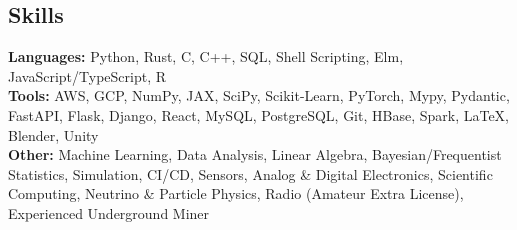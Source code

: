 \documentclass[margin,line]{resume}
\begin{document}
\begin{resume}

    \section{\mysidestyle Skills}\vspace{0mm}%
    \textbf{Languages:} Python, Rust, C, C++, SQL, Shell Scripting, Elm, JavaScript/TypeScript, R
    \vspace{1mm}\\\vspace{0mm}%
    \textbf{Tools:} AWS, GCP, NumPy, JAX, SciPy, Scikit-Learn, PyTorch, Mypy, Pydantic, FastAPI, Flask, Django, React, MySQL, PostgreSQL, Git, HBase, Spark, \LaTeX, Blender, Unity
    \vspace{1mm}\\\vspace{0mm}%
    \textbf{Other:} Machine Learning, Data Analysis, Linear Algebra, Bayesian/Frequentist Statistics, Simulation, CI/CD, Sensors, Analog \& Digital Electronics, Scientific Computing, Neutrino \& Particle Physics, Radio (Amateur Extra License), Experienced Underground Miner



\end{resume}
\end{document}
